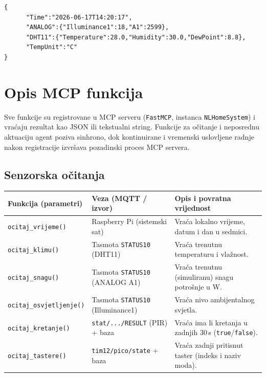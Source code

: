 \documentclass[11pt,a4paper]{article}
\begin{document}
\begin{lstlisting}[style=json,caption={tele/tim12\_tasmota/SENSOR - Očitavanje senzora na Tasmota krajnjem uređaju}]
{
      "Time":"2026-06-17T14:20:17",
      "ANALOG":{"Illuminance1":18,"A1":2599},
      "DHT11":{"Temperature":28.0,"Humidity":30.0,"DewPoint":8.8},
      "TempUnit":"C"
}
\end{lstlisting}

\section{Opis MCP funkcija}

Sve funkcije su registrovane u MCP serveru (\texttt{FastMCP}, instanca
\texttt{NLHomeSystem}) i vraćaju rezultat kao JSON ili tekstualni string. Funkcije za
očitanje i neposrednu aktuaciju agent poziva sinhrono, dok kontinuirane i vremenski
uslovljene radnje nakon registracije izvršava pozadinski proces MCP servera.

\subsection{Senzorska očitanja}
{\small
      \begin{tabularx}{\textwidth}{@{}L{0.30\textwidth} L{0.24\textwidth} X@{}}
            \toprule
            \textbf{Funkcija (parametri)}   & \textbf{Veza (MQTT / izvor)}             & \textbf{Opis i povratna vrijednost}                                   \\
            \midrule
            \texttt{ocitaj\_vrijeme()}      & Raspberry Pi (sistemski sat)             & Vraća lokalno vrijeme, datum i dan u sedmici.                         \\
            \texttt{ocitaj\_klimu()}        & Tasmota \texttt{STATUS10} (DHT11)        & Vraća trenutnu temperaturu i vlažnost.                                \\
            \texttt{ocitaj\_snagu()}        & Tasmota \texttt{STATUS10} (ANALOG A1)    & Vraća trenutnu (simuliranu) snagu potrošnje u W.                      \\
            \texttt{ocitaj\_osvjetljenje()} & Tasmota \texttt{STATUS10} (Illuminance1) & Vraća nivo ambijentalnog svjetla.                                     \\
            \texttt{ocitaj\_kretanje()}     & \texttt{stat/.../RESULT} (PIR) + baza    & Vraća ima li kretanja u zadnjih 30\,s (\texttt{true}/\texttt{false}). \\
            \texttt{ocitaj\_tastere()}      & \texttt{tim12/pico/state} + baza         & Vraća zadnji pritisnut taster (indeks i naziv moda).                  \\
            \bottomrule
      \end{tabularx}
}
\end{document}
